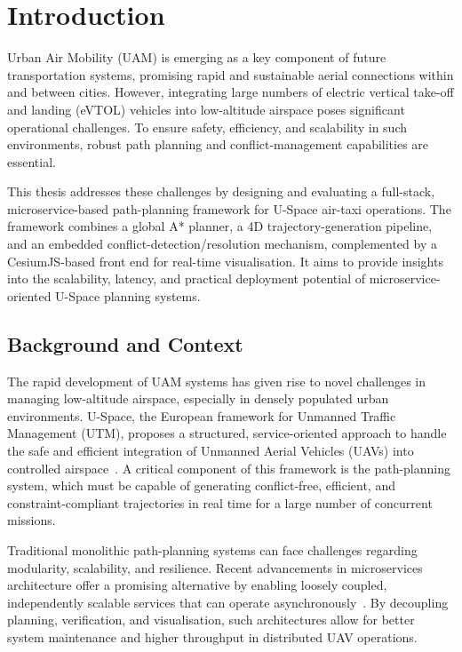 \chapter{Introduction}%
\label{s_introduction}

Urban Air Mobility (UAM) is emerging as a key component of future transportation systems, promising rapid and sustainable aerial connections within and between cities.  
However, integrating large numbers of electric vertical take-off and landing (eVTOL) vehicles into low-altitude airspace poses significant operational challenges.  
To ensure safety, efficiency, and scalability in such environments, robust path planning and conflict-management capabilities are essential.

This thesis addresses these challenges by designing and evaluating a full-stack, microservice-based path-planning framework for U-Space air-taxi operations.  
The framework combines a global A* planner, a 4D trajectory-generation pipeline, and an embedded conflict-detection/resolution mechanism, complemented by a CesiumJS-based front end for real-time visualisation.  
It aims to provide insights into the scalability, latency, and practical deployment potential of microservice-oriented U-Space planning systems.

\section{Background and Context}%
\label{s_motivation}

The rapid development of UAM systems has given rise to novel challenges in managing low-altitude airspace, especially in densely populated urban environments.  
U-Space, the European framework for Unmanned Traffic Management (UTM), proposes a structured, service-oriented approach to handle the safe and efficient integration of Unmanned Aerial Vehicles (UAVs) into controlled airspace~\cite{easa2020uspace}.  
A critical component of this framework is the path-planning system, which must be capable of generating conflict-free, efficient, and constraint-compliant trajectories in real time for a large number of concurrent missions.

Traditional monolithic path-planning systems can face challenges regarding modularity, scalability, and resilience.  
Recent advancements in microservices architecture offer a promising alternative by enabling loosely coupled, independently scalable services that can operate asynchronously~\cite{matlekovic2020uav}.  
By decoupling planning, verification, and visualisation, such architectures allow for better system maintenance and higher throughput in distributed UAV operations.

